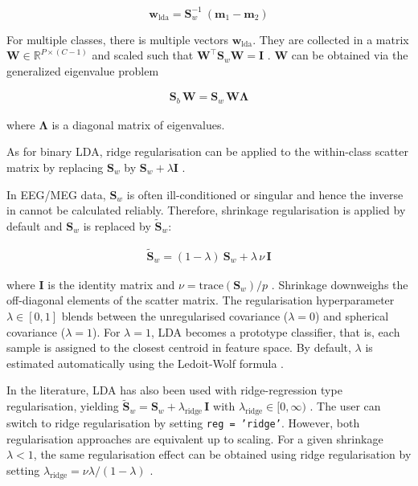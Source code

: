 \documentclass[utf8]{frontiersSCNS} %
\newcommand{\m}{\mathbf{m}}
\newcommand{\w}{\mathbf{w}}
\newcommand{\I}{\mathbf{I}}
\newcommand{\R}{\mathbb{R}}
\renewcommand{\S}{\mathbf{S}}
\newcommand{\W}{\mathbf{W}}
\newcommand{\ttt}[1]{\texttt{#1}}
\begin{document}
\begin{equation}
\label{eq:lda_solution}
\w_{\text{lda}} = \S_w^{-1}\ (\m_1 - \m_2)
\end{equation}

For multiple classes, there is multiple vectors $\w_{\text{lda}}$. They are collected in a matrix $\W\in\R^{P\times(C-1)}$ and scaled such that $\W^\top\S_w\W = \I$ \citep{Bishop2007}. $\W$ can be obtained via the generalized eigenvalue problem

\begin{align}
\label{eq:LDA-eigenvalue-multiclass}
\S_b\,\W = \S_w\,\W\mathbf{\Lambda}
\end{align}

where $\mathbf{\Lambda}$ is a diagonal matrix of eigenvalues.

As for binary LDA, ridge regularisation can be applied to the within-class scatter matrix by replacing $\S_w$ by $\S_w+\lambda\I$ \citep{Friedman1989}.

In EEG/MEG data, $\S_w$ is often ill-conditioned or singular and hence the inverse in  cannot be calculated reliably. Therefore, shrinkage regularisation is applied by default and $\S_w$ is replaced by $\widetilde{\S}_w$:

\begin{align}
\label{eq:shrinkage}
\widetilde{\S}_w = (1-\lambda)\ \S_w + \lambda\,\nu\,\I
\end{align}

where $\I$ is the identity matrix and $\nu = \text{trace}(\S_w)/p$ \citep{Blankertz2011}. Shrinkage downweighs the off-diagonal elements of the scatter matrix. The regularisation hyperparameter $\lambda\in [0,1]$ blends between the unregularised covariance ($\lambda=0$) and spherical covariance ($\lambda=1$). For $\lambda=1$, LDA becomes a prototype classifier, that is, each sample is assigned to the closest centroid in feature space. By default, $\lambda$ is estimated automatically using the Ledoit-Wolf formula \citep{Ledoit2003HoneyMatrix,Blankertz2011}.

In the literature, LDA has also been used with ridge-regression type regularisation, yielding $\widetilde{\S}_w = \S_w + \lambda_\text{ridge}\,\I$ with $\lambda_\text{ridge}\in [0,\infty)$ \citep{Friedman1989RegularizedAnalysis}. The user can switch to ridge regularisation by setting \ttt{reg = 'ridge'}. However, both regularisation approaches are equivalent up to scaling. For a given shrinkage $\lambda<1$, the same regularisation effect can be obtained using ridge regularisation by setting $\lambda_\text{ridge} = \nu\lambda / (1-\lambda)$
\citep{Treder2018Cross-validationLDA}.
\end{document}
